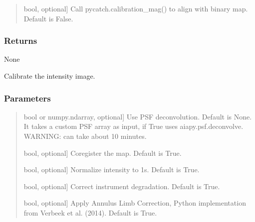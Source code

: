 \documentclass[letterpaper,10pt,english]{sphinxmanual}
\begin{document}
\begin{fulllineitems}
\begin{fulllineitems}
\begin{quote}
\begin{description}
\sphinxlineitem{align}{[}bool, optional{]}
\sphinxAtStartPar
Call pycatch.calibration\_mag() to align with binary map. Default is False.

\end{description}
\end{quote}


\subsubsection{Returns}
\label{\detokenize{pycatch/pycatch:id6}}
\sphinxAtStartPar
None

\end{fulllineitems}


\begin{fulllineitems}
\label{\detokenize{pycatch/pycatch:pycatch.pycatch.pycatch.calibration}}
\pysigstartsignatures
{}
\pysigstopsignatures
\sphinxAtStartPar
Calibrate the intensity image.


\subsubsection{Parameters}
\label{\detokenize{pycatch/pycatch:id7}}\begin{quote}
\begin{description}
\begin{description}
\sphinxlineitem{deconvolve}{[}bool or numpy.ndarray, optional{]}
\sphinxAtStartPar
Use PSF deconvolution. Default is None. It takes a custom PSF array as input, if True uses aiapy.psf.deconvolve.
WARNING: can take about 10 minutes.

\sphinxlineitem{register}{[}bool, optional{]}
\sphinxAtStartPar
Co\sphinxhyphen{}register the map. Default is True.

\sphinxlineitem{normalize}{[}bool, optional{]}
\sphinxAtStartPar
Normalize intensity to 1s. Default is True.

\sphinxlineitem{degradation}{[}bool, optional{]}
\sphinxAtStartPar
Correct instrument degradation. Default is True.

\sphinxlineitem{alc}{[}bool, optional{]}
\sphinxAtStartPar
Apply Annulus Limb Correction, Python implementation from Verbeek et al. (2014). Default is True.


\end{description}
\end{description}
\end{quote}
\end{fulllineitems}
\end{fulllineitems}
\end{document}
